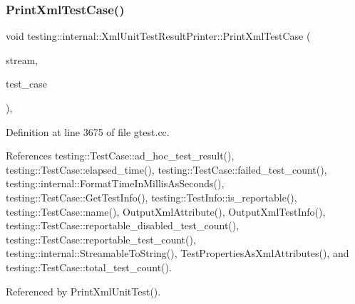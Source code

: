 \subsubsection{\texorpdfstring{Print\+Xml\+Test\+Case()}{PrintXmlTestCase()}}
{\footnotesize\ttfamily void testing\+::internal\+::\+Xml\+Unit\+Test\+Result\+Printer\+::\+Print\+Xml\+Test\+Case (\begin{DoxyParamCaption}\item[{\+::std\+::ostream $\ast$}]{stream,  }\item[{const \hyperlink{classtesting_1_1TestCase}{Test\+Case} \&}]{test\+\_\+case }\end{DoxyParamCaption})\hspace{0.3cm}{\ttfamily [static]}, {\ttfamily [private]}}



Definition at line 3675 of file gtest.\+cc.



References testing\+::\+Test\+Case\+::ad\+\_\+hoc\+\_\+test\+\_\+result(), testing\+::\+Test\+Case\+::elapsed\+\_\+time(), testing\+::\+Test\+Case\+::failed\+\_\+test\+\_\+count(), testing\+::internal\+::\+Format\+Time\+In\+Millis\+As\+Seconds(), testing\+::\+Test\+Case\+::\+Get\+Test\+Info(), testing\+::\+Test\+Info\+::is\+\_\+reportable(), testing\+::\+Test\+Case\+::name(), Output\+Xml\+Attribute(), Output\+Xml\+Test\+Info(), testing\+::\+Test\+Case\+::reportable\+\_\+disabled\+\_\+test\+\_\+count(), testing\+::\+Test\+Case\+::reportable\+\_\+test\+\_\+count(), testing\+::internal\+::\+Streamable\+To\+String(), Test\+Properties\+As\+Xml\+Attributes(), and testing\+::\+Test\+Case\+::total\+\_\+test\+\_\+count().



Referenced by Print\+Xml\+Unit\+Test().


